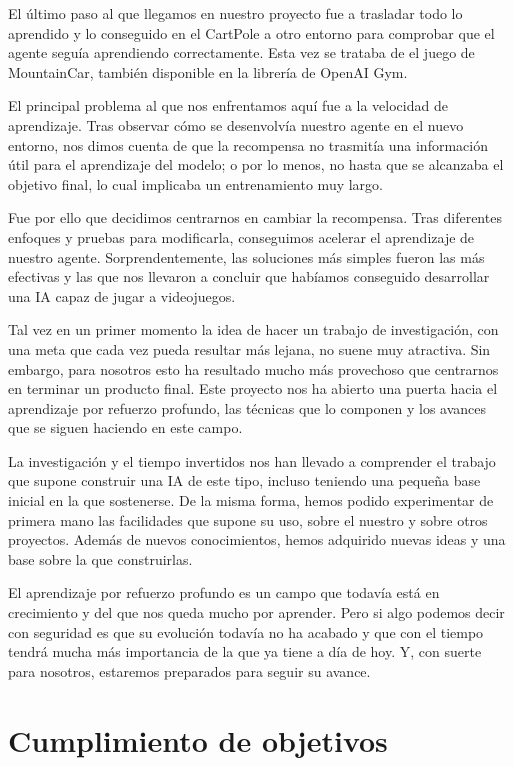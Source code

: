El último paso al que llegamos en nuestro proyecto fue a trasladar todo lo aprendido y lo conseguido en el CartPole a otro entorno para comprobar que el agente seguía aprendiendo correctamente. Esta vez se trataba de el juego de MountainCar, también disponible en la librería de OpenAI Gym. 

El principal problema al que nos enfrentamos aquí fue a la velocidad de aprendizaje. Tras observar cómo se desenvolvía nuestro agente en el nuevo entorno, nos dimos cuenta de que la recompensa no trasmitía una información útil para el aprendizaje del modelo; o por lo menos, no hasta que se alcanzaba el objetivo final, lo cual implicaba un entrenamiento muy largo. 

Fue por ello que decidimos centrarnos en cambiar la recompensa. Tras diferentes enfoques y pruebas para modificarla, conseguimos acelerar el aprendizaje de nuestro agente. Sorprendentemente, las soluciones más simples fueron las más efectivas y las que nos llevaron a concluir que habíamos conseguido desarrollar una IA capaz de jugar a videojuegos.

Tal vez en un primer momento la idea de hacer un trabajo de investigación, con una meta que cada vez pueda resultar más lejana, no suene muy atractiva. Sin embargo, para nosotros esto ha resultado mucho más provechoso que centrarnos en terminar un producto final. Este proyecto nos ha abierto una puerta hacia el aprendizaje por refuerzo profundo, las técnicas que lo componen y los avances que se siguen haciendo en este campo. 

La investigación y el tiempo invertidos nos han llevado a comprender el trabajo que supone construir una IA de este tipo, incluso teniendo una pequeña base inicial en la que sostenerse. De la misma forma, hemos podido experimentar de primera mano las facilidades que supone su uso, sobre el nuestro y sobre otros proyectos. Además de nuevos conocimientos, hemos adquirido nuevas ideas y una base sobre la que construirlas. 

El aprendizaje por refuerzo profundo es un campo que todavía está en crecimiento y del que nos queda mucho por aprender. Pero si algo podemos decir con seguridad es que su evolución todavía no ha acabado y que con el tiempo tendrá mucha más importancia de la que ya tiene a día de hoy. Y, con suerte para nosotros, estaremos preparados para seguir su avance.

\section{Cumplimiento de objetivos}

